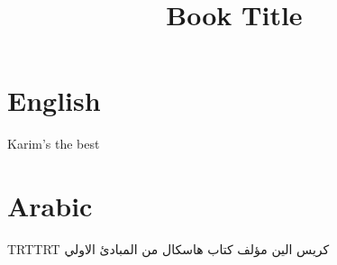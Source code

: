 \documentclass{article}
\newenvironment{Arabic}     %
               {\textdir TRT\pardir TRT\arabicfont}{}
\begin{document}
\title{Book Title}

\section{English}

Karim's the best

\section{Arabic}

\begin{Arabic}
كريس الين مؤلف كتاب هاسكال من المبادئ الاولي
\end{Arabic}
\end{document}
